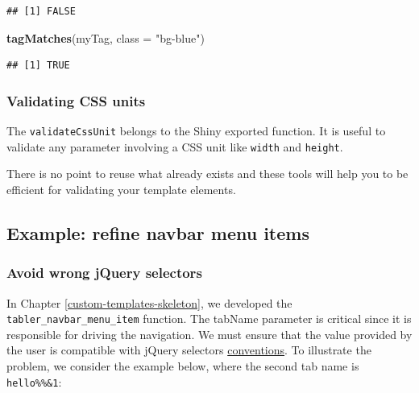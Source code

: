 \documentclass[
]{book}
\newenvironment{Shaded}{\begin{snugshade}}{\end{snugshade}}
\newcommand{\DataTypeTok}[1]{\textcolor[rgb]{0.13,0.29,0.53}{#1}}
\newcommand{\KeywordTok}[1]{\textcolor[rgb]{0.13,0.29,0.53}{\textbf{#1}}}
\newcommand{\NormalTok}[1]{#1}
\newcommand{\StringTok}[1]{\textcolor[rgb]{0.31,0.60,0.02}{#1}}
\begin{document}
\begin{verbatim}
## [1] FALSE
\end{verbatim}

\begin{Shaded}
\begin{Highlighting}[]
\KeywordTok{tagMatches}\NormalTok{(myTag, }\DataTypeTok{class =} \StringTok{"bg-blue"}\NormalTok{)}
\end{Highlighting}
\end{Shaded}

\begin{verbatim}
## [1] TRUE
\end{verbatim}

\hypertarget{validating-css-units}{%
\subsubsection{Validating CSS units}\label{validating-css-units}}

The \texttt{validateCssUnit} belongs to the Shiny exported function. It is useful to validate any parameter involving a CSS unit like \texttt{width} and \texttt{height}.

There is no point to reuse what already exists and these tools will help you to be efficient for validating your template elements.

\hypertarget{example-refine-navbar-menu-items}{%
\subsection{Example: refine navbar menu items}\label{example-refine-navbar-menu-items}}

\hypertarget{avoid-wrong-jquery-selectors}{%
\subsubsection{Avoid wrong jQuery selectors}\label{avoid-wrong-jquery-selectors}}

In Chapter \ref{custom-templates-skeleton}, we developed the \texttt{tabler\_navbar\_menu\_item} function. The tabName parameter is critical since it is responsible for driving the navigation. We must ensure that the value provided by the user is compatible with jQuery selectors \href{https://api.jquery.com/category/selectors/}{conventions}. To illustrate the problem, we consider the example below, where the second tab name is \texttt{hello\%\%\&1}:
\end{document}
